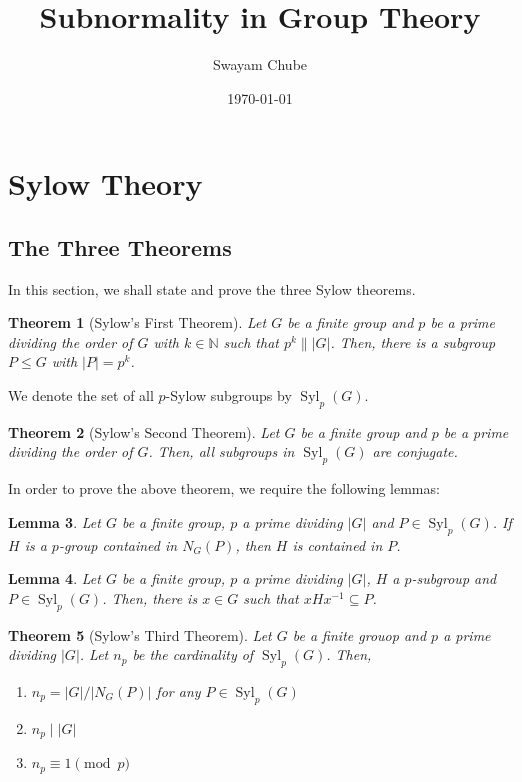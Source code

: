 \documentclass[12pt]{article}
\title{Subnormality in Group Theory}
\author{Swayam Chube}
\date{\today}
\theoremstyle{thmstyle}
\newtheorem{theorem}{Theorem}[section]
\newtheorem{lemma}[theorem]{Lemma}
\theoremstyle{defstyle}
\newcommand{\N}{\mathbb{N}}
\renewcommand{\le}{\leqslant}
\newcommand{\Syl}{\operatorname{Syl}}
\begin{document}
\maketitle

\tableofcontents

\section{Sylow Theory}

\subsection{The Three Theorems}

In this section, we shall state and prove the three Sylow theorems.

\begin{theorem}[Sylow's First Theorem]
    Let $G$ be a finite group and $p$ be a prime dividing the order of $G$ with $k\in\N$ such that $p^k\||G|$. Then, there is a subgroup $P\le G$ with $|P| = p^k$.
\end{theorem}

We denote the set of all $p$-Sylow subgroups by $\Syl_p(G)$.

\begin{theorem}[Sylow's Second Theorem]
    Let $G$ be a finite group and $p$ be a prime dividing the order of $G$. Then, all subgroups in $\Syl_p(G)$ are conjugate.
\end{theorem}

In order to prove the above theorem, we require the following lemmas: 
\begin{lemma}
    Let $G$ be a finite group, $p$ a prime dividing $|G|$ and $P\in\Syl_p(G)$. If $H$ is a $p$-group contained in $N_G(P)$, then $H$ is contained in $P$.
\end{lemma}

\begin{lemma}
    Let $G$ be a finite group, $p$ a prime dividing $|G|$, $H$ a $p$-subgroup and $P\in\Syl_p(G)$. Then, there is $x\in G$ such that $xHx^{-1}\subseteq P$.
\end{lemma}

\begin{theorem}[Sylow's Third Theorem]
    Let $G$ be a finite grouop and $p$ a prime dividing $|G|$. Let $n_p$ be the cardinality of $\Syl_p(G)$. Then, 
    \begin{enumerate}
        \item $n_p = |G|/|N_G(P)|$ for any $P\in\Syl_p(G)$
        \item $n_p\mid |G|$
        \item $n_p\equiv1\pmod p$
    \end{enumerate}
\end{theorem}
\end{document}
